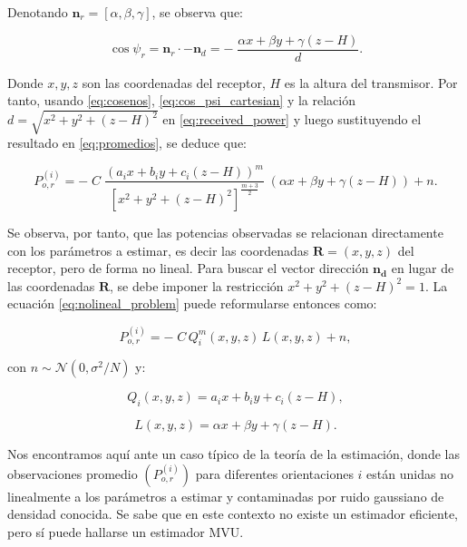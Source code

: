 \documentclass[lettersize,journal]{IEEEtran}
\begin{document}
Denotando \(\mathbf{n}_r = [\alpha, \beta, \gamma]\), se observa que:

\begin{equation}
\cos\psi_{r}= \mathbf{n}_r \cdot \mathbf{-n}_{d}
= -\;\frac{\alpha x + \beta y + \gamma (z-H)}{d}.
\label{eq:cos_psi_cartesian}
\end{equation}


Donde $x,y,z$ son las coordenadas del receptor, $H$ es la altura del transmisor. Por tanto, usando \ref{eq:cosenos},  \ref{eq:cos_psi_cartesian} y la relación $d = \sqrt{x^2 + y^2 + (z-H)^2}$ en \ref{eq:received_power} y luego sustituyendo el resultado en \ref{eq:promedios}, se deduce que:

\begin{equation}
P_{o,r}^{(i)} = -\; C \; \frac{(a_i x + b_i y + c_i (z-H))^m}{[x^2 + y^2 + (z-H)^2]^{\frac{m+3}{2}}}
\;(\alpha x + \beta y + \gamma (z-H))+ n. 
\label{eq:nolineal_problem}
\end{equation}



Se observa, por tanto, que las potencias observadas se relacionan directamente con los parámetros a estimar, es decir las coordenadas $\mathbf{R}=(x,y,z)$ del receptor, pero de forma no lineal. Para buscar el vector dirección $\mathbf{n_d}$ en lugar de las coordenadas $\mathbf{R}$, se debe imponer la restricción $x^2 + y^2 + (z-H)^2 = 1$. La ecuación \ref{eq:nolineal_problem} puede reformularse entonces como:

\begin{equation}
    P_{o,r}^{(i)}=-\;C\,Q_i^m(x,y,z)\,L(x,y,z)+ n,
\end{equation}

con \(n\sim\mathcal{N}(0,\sigma^2/N)\) y:

\begin{equation}
Q_i(x,y,z) = a_i x + b_i y + c_i (z-H),
\label{eq:Q}
\end{equation}

\begin{equation}
L(x,y,z) = \alpha x + \beta y + \gamma (z-H).   
\label{eq:L}
\end{equation}


Nos encontramos aquí ante un caso típico de la teoría de la estimación, donde las observaciones promedio $(P_{o,r}^{(i)})$ para diferentes orientaciones $i$ están unidas no linealmente a los parámetros a estimar y contaminadas por ruido gaussiano de densidad conocida. Se sabe que en este contexto no existe un estimador eficiente, pero sí puede hallarse un estimador MVU.
\end{document}
